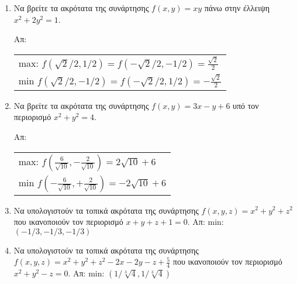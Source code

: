 \documentclass[a4paper,table]{report}
\begin{document}
\begin{enumerate}

  \item Να βρείτε τα ακρότατα της συνάρτησης $ f(x,y) = xy $ πάνω στην έλλειψη 
    $ x^{2}+2y^{2}=1 $.

    \hfill Απ: 
    \begin{tabular}{l}
      max: $ f(\sqrt{2} /2, 1/2) = f(- \sqrt{2} /2, -1/2) = \frac{\sqrt{2}}{2} $ \\
      min $ f(\sqrt{2} /2, -1/2) = f(- \sqrt{2} /2, 1/2) = -\frac{\sqrt{2}}{2} $ \\
    \end{tabular}

  \item Να βρείτε τα ακρότατα της συνάρτησης $ f(x,y) = 3x-y+6 $ υπό τον περιορισμό 
    $ x^{2}+y^{2}=4 $.

    \hfill Απ:  
    \begin{tabular}{l}
      max: $ f(\frac{6}{\sqrt{10}} , - \frac{2}{\sqrt{10}}) = 2 \sqrt{10} +6 $ \\
      min $ f(-\frac{6}{\sqrt{10}} , + \frac{2}{\sqrt{10}}) = -2 \sqrt{10} +6 $ \\
    \end{tabular}



  \item Να υπολογιστούν τα τοπικά ακρότατα της συνάρτησης $ f(x,y,z) = x^{2}+y^{2}+z^{2}
    $ που ικανοποιούν τον περιορισμό $ x+y+z+1=0 $.
    \hfill Απ: min: $ (-1/3,-1/3,-1/3) $ 

  \item Να υπολογιστούν τα τοπικά ακρότατα της συνάρτησης 
    $ f(x,y,z) = x^{2}+y^{2}+z^{2}-2x-2y-z+ \frac{5}{4} $ που ικανοποιούν τον 
    περιορισμό $ x^{2}+y^{2}-z=0  $.
    \hfill Απ: min: $ (1/ \sqrt[3]{4} , 1/ \sqrt[3]{4}) $ 


\end{enumerate}
\end{document}
